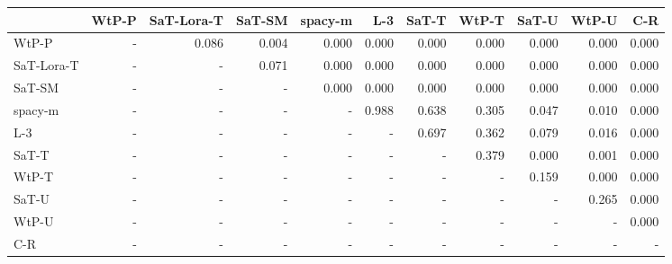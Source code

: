 \begin{tabular}{lrrrrrrrrrr}
\toprule
 & WtP-P & SaT-Lora-T & SaT-SM & spacy-m & L-3 & SaT-T & WtP-T & SaT-U & WtP-U & C-R \\
\midrule
WtP-P & - & 0.086 & 0.004 & 0.000 & 0.000 & 0.000 & 0.000 & 0.000 & 0.000 & 0.000 \\
SaT-Lora-T & - & - & 0.071 & 0.000 & 0.000 & 0.000 & 0.000 & 0.000 & 0.000 & 0.000 \\
SaT-SM & - & - & - & 0.000 & 0.000 & 0.000 & 0.000 & 0.000 & 0.000 & 0.000 \\
spacy-m & - & - & - & - & 0.988 & 0.638 & 0.305 & 0.047 & 0.010 & 0.000 \\
L-3 & - & - & - & - & - & 0.697 & 0.362 & 0.079 & 0.016 & 0.000 \\
SaT-T & - & - & - & - & - & - & 0.379 & 0.000 & 0.001 & 0.000 \\
WtP-T & - & - & - & - & - & - & - & 0.159 & 0.000 & 0.000 \\
SaT-U & - & - & - & - & - & - & - & - & 0.265 & 0.000 \\
WtP-U & - & - & - & - & - & - & - & - & - & 0.000 \\
C-R & - & - & - & - & - & - & - & - & - & - \\
\bottomrule
\end{tabular}

